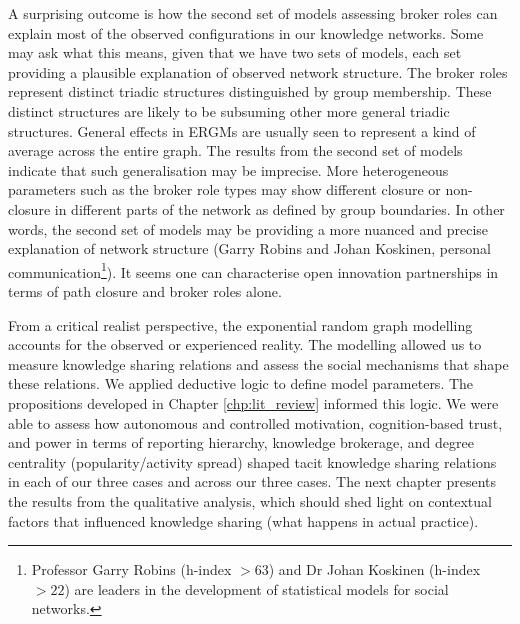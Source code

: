 A surprising outcome is how the second set of models assessing broker roles can explain most of the observed configurations in our knowledge networks. Some may ask what this means, given that we have two sets of models, each set providing a plausible explanation of observed network structure. The broker roles represent distinct triadic structures distinguished by group membership. These distinct structures are likely to be subsuming other more general triadic structures. General effects in ERGMs are usually seen to represent a kind of average across the entire graph. The results from the second set of models indicate that such generalisation may be imprecise. More heterogeneous parameters such as the broker role types may show different closure or non-closure in different parts of the network as defined by group boundaries. In other words, the second set of models may be providing a more nuanced and precise explanation of network structure (Garry Robins and Johan Koskinen, personal communication\footnote{Professor Garry Robins (h-index $> 63$) and Dr Johan Koskinen (h-index $>22$) are leaders in the development of statistical models for social networks.}). It seems one can characterise open innovation partnerships in terms of path closure and broker roles alone. \medskip

From a critical realist perspective, the exponential random graph modelling accounts for the observed or experienced reality. The modelling allowed us to measure knowledge sharing relations and assess the social mechanisms that shape these relations. We applied deductive logic to define model parameters. The propositions developed in Chapter \ref{chp:lit_review} informed this logic. We were able to assess how autonomous and controlled motivation, cognition-based trust, and power in terms of reporting hierarchy, knowledge brokerage, and degree centrality (popularity/activity spread) shaped tacit knowledge sharing relations in each of our three cases and across our three cases. The next chapter presents the results from the qualitative analysis, which should shed light on contextual factors that influenced knowledge sharing (what happens in actual practice).